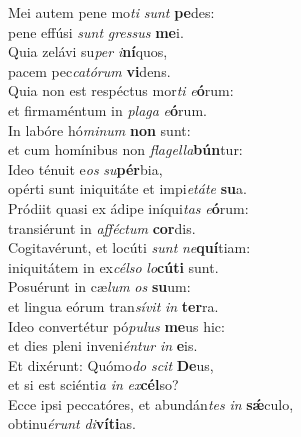 \evenverse Mei autem pene mo\textit{ti} \textit{sunt} \textbf{pe}des:~\*\\
\evenverse pene effúsi \textit{sunt} \textit{gres}\textit{sus} \textbf{me}i.\\
\oddverse Quia zelávi su\textit{per} \textit{i}\textbf{ní}quos,~\*\\
\oddverse pacem pec\textit{ca}\textit{tó}\textit{rum} \textbf{vi}dens.\\
\evenverse Quia non est respéctus mor\textit{ti} \textit{e}\textbf{ó}rum:~\*\\
\evenverse et firmaméntum in \textit{pla}\textit{ga} \textit{e}\textbf{ó}rum.\\
\oddverse In labóre hó\textit{mi}\textit{num} \textbf{non} sunt:~\*\\
\oddverse et cum homínibus non \textit{fla}\textit{gel}\textit{la}\textbf{bún}tur:\\
\evenverse Ideo ténuit e\textit{os} \textit{su}\textbf{pér}bia,~\*\\
\evenverse opérti sunt iniquitáte et impi\textit{e}\textit{tá}\textit{te} \textbf{su}a.\\
\oddverse Pródiit quasi ex ádipe iníqui\textit{tas} \textit{e}\textbf{ó}rum:~\*\\
\oddverse transiérunt in \textit{af}\textit{fé}\textit{ctum} \textbf{cor}dis.\\
\evenverse Cogitavérunt, et locúti \textit{sunt} \textit{ne}\textbf{quí}tiam:~\*\\
\evenverse iniquitátem in ex\textit{cél}\textit{so} \textit{lo}\textbf{cú}\textbf{ti} sunt.\\
\oddverse Posuérunt in cæ\textit{lum} \textit{os} \textbf{su}um:~\*\\
\oddverse et lingua eórum tran\textit{sí}\textit{vit} \textit{in} \textbf{ter}ra.\\
\evenverse Ideo convertétur pó\textit{pu}\textit{lus} \textbf{me}us hic:~\*\\
\evenverse et dies pleni inveni\textit{én}\textit{tur} \textit{in} \textbf{e}is.\\
\oddverse Et dixérunt: Quómo\textit{do} \textit{scit} \textbf{De}us,~\*\\
\oddverse et si est sciénti\textit{a} \textit{in} \textit{ex}\textbf{cél}so?\\
\evenverse Ecce ipsi peccatóres, et abundán\textit{tes} \textit{in} \textbf{sǽ}culo,~\*\\
\evenverse obtinu\textit{é}\textit{runt} \textit{di}\textbf{ví}\textbf{ti}as.\\
